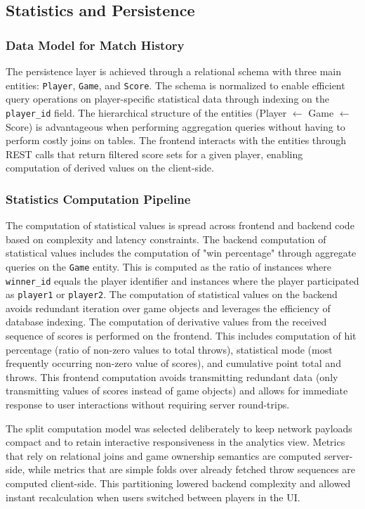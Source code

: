 \subsection{Statistics and Persistence}

\subsubsection{Data Model for Match History}
The persistence layer is achieved through a relational schema with three main entities: \texttt{Player}, \texttt{Game}, and \texttt{Score}. The schema is normalized to enable efficient query operations on player-specific statistical data through indexing on the \texttt{player\_id} field. The hierarchical structure of the entities (Player $\leftarrow$ Game $\leftarrow$ Score) is advantageous when performing aggregation queries without having to perform costly joins on tables. The frontend interacts with the entities through REST calls that return filtered score sets for a given player, enabling computation of derived values on the client-side.

\subsubsection{Statistics Computation Pipeline}
The computation of statistical values is spread across frontend and backend code based on complexity and latency constraints. The backend computation of statistical values includes the computation of "win percentage" through aggregate queries on the \texttt{Game} entity. This is computed as the ratio of instances where \texttt{winner\_id} equals the player identifier and instances where the player participated as \texttt{player1} or \texttt{player2}. The computation of statistical values on the backend avoids redundant iteration over game objects and leverages the efficiency of database indexing. The computation of derivative values from the received sequence of scores is performed on the frontend. This includes computation of hit percentage (ratio of non-zero values to total throws), statistical mode (most frequently occurring non-zero value of scores), and cumulative point total and throws. This frontend computation avoids transmitting redundant data (only transmitting values of scores instead of game objects) and allows for immediate response to user interactions without requiring server round-trips.

The split computation model was selected deliberately to keep network payloads compact and to retain interactive responsiveness in the analytics view. Metrics that rely on relational joins and game ownership semantics are computed server-side, while metrics that are simple folds over already fetched throw sequences are computed client-side. This partitioning lowered backend complexity and allowed instant recalculation when users switched between players in the UI.

